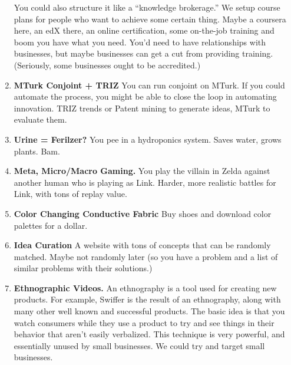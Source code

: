 \documentclass[paper=a4, fontsize=11pt]{scrartcl} %
\numberwithin{equation}{section} %
\numberwithin{figure}{section} %
\numberwithin{table}{section} %
\begin{document}
\begin{enumerate}
You could also structure it like a ``knowledge brokerage.''  We setup course plans for people who want to achieve some certain thing.  Maybe a coursera here, an edX there, an online certification, some on-the-job training and boom you have what you need.  You'd need to have relationships with businesses, but maybe businesses can get a cut from providing training.  (Seriously, some businesses ought to be accredited.)  

\item \textbf{MTurk Conjoint + TRIZ}  You can run conjoint on MTurk.  If you could automate the process, you might be able to close the loop in automating innovation.  TRIZ trends or Patent mining to generate ideas, MTurk to evaluate them.  

\item \textbf{Urine = Ferilzer?}  You pee in a hydroponics system.  Saves water, grows plants.  Bam.

\item \textbf{Meta, Micro/Macro Gaming.}  You play the villain in Zelda against another human who is playing as Link.  Harder, more realistic battles for Link, with tons of replay value.

\item \textbf{Color Changing Conductive Fabric} Buy shoes and download color palettes for a dollar.

\item \textbf{Idea Curation} A website with tons of concepts that can be randomly matched.  Maybe not randomly later (so you have a problem and a list of similar problems with their solutions.) 

\item \textbf{Ethnographic Videos.}  An ethnography is a tool used for creating new products.  For example, Swiffer is the result of an ethnography, along with many other well known and successful products.  The basic idea is that you watch consumers while they use a product to try and see things in their behavior that aren't easily verbalized.  This technique is very powerful, and essentially unused by small businesses.  We could try and target small businesses.


\end{enumerate}
\end{document}
